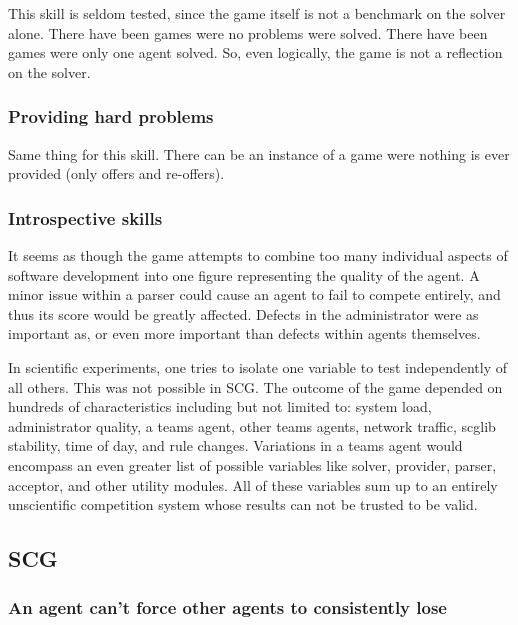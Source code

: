 \documentclass[letterpaper,12pt,oneside]{article}
\begin{document}
This skill is seldom tested, since the game itself is not a benchmark on
the solver alone. There have been games were no problems were solved. There
have been games were only one agent solved. So, even logically, the game is
not a reflection on the solver.

\subsubsection{Providing hard problems}

Same thing for this skill. There can be an instance of a game were nothing
is ever provided (only offers and re-offers).

\subsubsection{Introspective skills}
It seems as though the game attempts to combine too many individual aspects of
software development into one figure representing the quality of the agent.
A minor issue within a parser could cause an agent to fail to compete
entirely, and thus its score would be greatly affected. Defects in the
administrator were as important as, or even more important than defects within
agents themselves.

In scientific experiments, one tries to isolate one variable
to test independently of all others. This was not possible in SCG. The
outcome of the game depended on hundreds of characteristics including but not
limited to: system load, administrator quality, a teams agent, other teams
agents, network traffic, scglib stability, time of day, and rule changes.
Variations in a teams agent would encompass an even greater list of possible
variables like solver, provider, parser, acceptor, and other utility modules.
All of these variables sum up to an entirely unscientific competition system
whose results can not be trusted to be valid.

\subsection{SCG}

\subsubsection{An agent can't force other agents to consistently lose}
\end{document}
